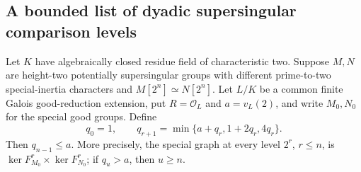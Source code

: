 \subsection{A bounded list of dyadic supersingular comparison levels}

\begin{lemma}
\label{lem:B-RD45}
Let $K$ have algebraically closed residue field of characteristic two.
Suppose $M,N$ are height-two potentially supersingular groups with
different prime-to-two special-inertia characters and
$M[2^n]\simeq N[2^n]$. Let $L/K$ be a common finite Galois
good-reduction extension, put $R=\mathcal O_L$ and $a=v_L(2)$,
and write $M_0,N_0$ for the special good groups.
Define
\[
 q_0=1,\qquad q_{r+1}=\min\{a+q_r,1+2q_r,4q_r\}.
 \tag{B-RD45.1}
\]
Then $q_{n-1}\le a$.
More precisely, the special graph at every level $2^r$, $r\le n$,
is $\ker F_{M_0}^r\times\ker F_{N_0}^r$; if $q_u>a$, then
$u\ge n$.
\end{lemma}
